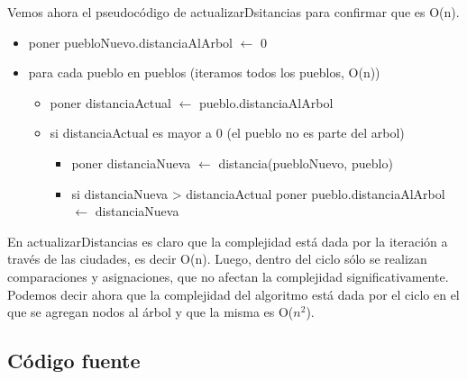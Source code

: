 Vemos ahora el pseudoc\'odigo de actualizarDsitancias para confirmar que es O(n).\\

\begin{itemize}
\item poner puebloNuevo.distanciaAlArbol $\leftarrow$ 0
\item para cada pueblo en pueblos (iteramos todos los pueblos, O(n))
\begin{itemize}
	\item poner distanciaActual $\leftarrow$ pueblo.distanciaAlArbol
	\item si distanciaActual es mayor a 0 (el pueblo no es parte del arbol)
	\begin{itemize}
		\item poner distanciaNueva $\leftarrow$ distancia(puebloNuevo, pueblo)
		\item si distanciaNueva > distanciaActual poner pueblo.distanciaAlArbol $\leftarrow$ distanciaNueva
	\end{itemize}
\end{itemize}
\end{itemize}

En actualizarDistancias es claro que la complejidad est\'a dada por la iteraci\'on a trav\'es de las ciudades, es decir O(n). Luego, dentro del ciclo s\'olo se realizan comparaciones y asignaciones, que no afectan la complejidad significativamente.\\

Podemos decir ahora que la complejidad del algoritmo est\'a dada por el ciclo en el que se agregan nodos al \'arbol y que la misma es O($n^2$).

\newpage

\subsection{C\'odigo fuente}

